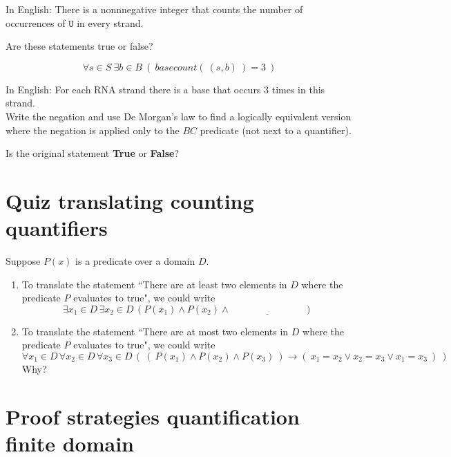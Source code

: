 \documentclass[12pt, oneside]{article}
\newcommand{\U}[0]{\texttt{U}}
\begin{document}
In English: There is a nonnnegative integer that counts the number of occurrences of $\U$ in every 
strand.\\

\vfill

Are these statements true or false?

\newpage

$$\forall s \in S ~\exists b\in B ~(~basecount(~(s,b)~) = 3~)$$

In English: For each RNA strand there is a base that occurs 3 times in this strand.\\

Write the negation and use De Morgan's law to find a 
logically equivalent version where the negation is applied only to the 
$BC$ predicate (not next to a quantifier).

\vspace{60pt}


Is the original statement {\bf True} or {\bf False}?

\vfill
 \vfill
\section*{Quiz translating counting quantifiers}


Suppose $P(x)$ is  a predicate over a domain $D$.
\begin{enumerate}
    \item To translate the statement
    ``There are at least two  elements in $D$
    where the predicate $P$ evaluates to true", we
    could  write
    \[
    \exists  x_1 \in D \, \exists x_2 \in D  \, (P(x_1) \wedge P(x_2) \wedge \underline{\phantom{\text{FILL IN BLANK}}})
    \]
    \vfill
    \item  To translate the statement
    ``There are at most two  elements in $D$
    where the predicate $P$ evaluates to true", we
    could write
    \[
    \forall  x_1 \in D \, \forall x_2 \in D \, \forall x_3 \in  D \, \left(~ (~P(x_1) \wedge P(x_2)  \wedge P(x_3) ~) \to (~ x_1 = x_2 \vee x_2 = x_3 \vee x_1 = x_3~)~\right)
    \]
    Why?
    \vfill
\end{enumerate} \vfill
\section*{Proof strategies quantification finite domain}
\end{document}
